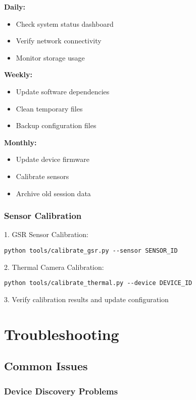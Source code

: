 \textbf{Daily:}
\begin{itemize}
\item Check system status dashboard
\item Verify network connectivity
\item Monitor storage usage
\end{itemize}

\textbf{Weekly:}
\begin{itemize}
\item Update software dependencies
\item Clean temporary files
\item Backup configuration files
\end{itemize}

\textbf{Monthly:}
\begin{itemize}
\item Update device firmware
\item Calibrate sensors
\item Archive old session data
\end{itemize}

\subsubsection{Sensor Calibration}

1. GSR Sensor Calibration:
\begin{verbatim}
python tools/calibrate_gsr.py --sensor SENSOR_ID
\end{verbatim}

2. Thermal Camera Calibration:
\begin{verbatim}
python tools/calibrate_thermal.py --device DEVICE_ID
\end{verbatim}

3. Verify calibration results and update configuration

\section{Troubleshooting}

\subsection{Common Issues}

\subsubsection{Device Discovery Problems}

